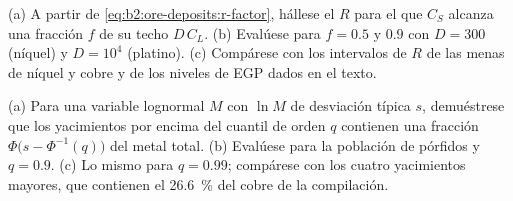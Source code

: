 \begin{exercise}[$\star\star\star$]\label{exo:b2:ore-deposits:11}
(a) A partir de \eqref{eq:b2:ore-deposits:r-factor}, hállese el $R$ para el que $C_S$ alcanza una fracción $f$
de su techo $D\,C_L$. (b) Evalúese para $f = 0.5$ y $0.9$ con $D = 300$ (níquel) y $D =
10^4$ (platino). (c) Compárese con los intervalos de $R$ de las menas de níquel y cobre y de los niveles de EGP dados
en el texto.
\end{exercise}

\begin{exercise}[$\star\star\star$]\label{exo:b2:ore-deposits:12}
(a) Para una variable lognormal $M$ con $\ln M$ de desviación típica $s$, demuéstrese que los yacimientos por encima
del cuantil de orden $q$ contienen una fracción $\Phi\bigl(s - \Phi^{-1}(q)\bigr)$ del metal total.
(b) Evalúese para la población de pórfidos y $q = 0.9$. (c) Lo mismo para $q = 0.99$; compárese con
los cuatro yacimientos mayores, que contienen el \qty{26.6}{\percent} del cobre de la compilación.
\end{exercise}

